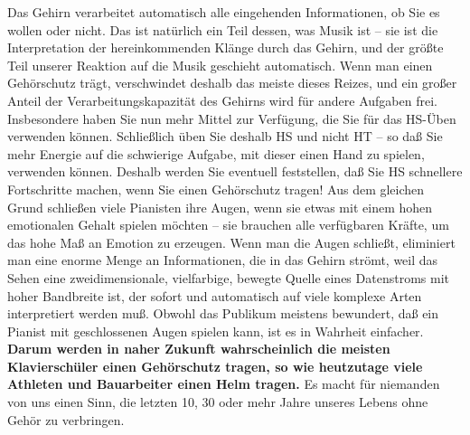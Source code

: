 Das Gehirn verarbeitet automatisch alle eingehenden Informationen, ob Sie es wollen oder nicht.
Das ist natürlich ein Teil dessen, was Musik ist -- sie ist die Interpretation der hereinkommenden Klänge durch das Gehirn, und der größte Teil unserer Reaktion auf die Musik geschieht automatisch.
Wenn man einen Gehörschutz trägt, verschwindet deshalb das meiste dieses Reizes, und ein großer Anteil der Verarbeitungskapazität des Gehirns wird für andere Aufgaben frei.
Insbesondere haben Sie nun mehr Mittel zur Verfügung, die Sie für das HS-Üben verwenden können.
Schließlich üben Sie deshalb HS und nicht HT -- so daß Sie mehr Energie auf die schwierige Aufgabe, mit dieser einen Hand zu spielen, verwenden können.
Deshalb werden Sie eventuell feststellen, daß Sie HS schnellere Fortschritte machen, wenn Sie einen Gehörschutz tragen!
Aus dem gleichen Grund schließen viele Pianisten ihre Augen, wenn sie etwas mit einem hohen emotionalen Gehalt spielen möchten -- sie brauchen alle verfügbaren Kräfte, um das hohe Maß an Emotion zu erzeugen.
Wenn man die Augen schließt, eliminiert man eine enorme Menge an Informationen, die in das Gehirn strömt, weil das Sehen eine zweidimensionale, vielfarbige, bewegte Quelle eines Datenstroms mit hoher Bandbreite ist, der sofort und automatisch auf viele komplexe Arten interpretiert werden muß.
Obwohl das Publikum meistens bewundert, daß ein Pianist mit geschlossenen Augen spielen kann, ist es in Wahrheit einfacher.
\textbf{Darum werden in naher Zukunft wahrscheinlich die meisten Klavierschüler einen Gehörschutz tragen, so wie heutzutage viele Athleten und Bauarbeiter einen Helm tragen.}
Es macht für niemanden von uns einen Sinn, die letzten 10, 30 oder mehr Jahre unseres Lebens ohne Gehör zu verbringen.

